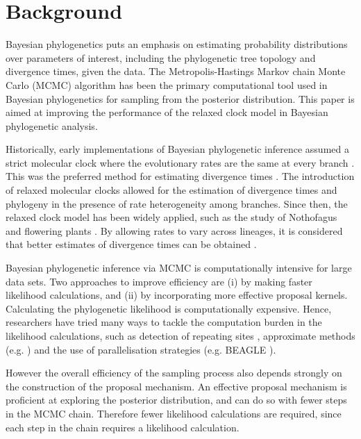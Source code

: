 \documentclass{bmcart}
\begin{document}

\section*{Background}
Bayesian phylogenetics puts an emphasis on estimating probability distributions over parameters of interest, including the phylogenetic tree topology and divergence times, given the data. The Metropolis-Hastings Markov chain Monte Carlo (MCMC) \cite{metropolis1953equation,hastings1970monte} algorithm has been the primary computational tool used in Bayesian phylogenetics for sampling from the posterior distribution. This paper is aimed at improving the performance of the relaxed clock model in Bayesian phylogenetic analysis.

Historically, early implementations of Bayesian phylogenetic inference \cite{yang1997bayesian} assumed a strict molecular clock where the evolutionary rates are the same at every branch \cite{zuckerkandl1965evolutionary}. This was the preferred method for estimating divergence times \cite{yang1997bayesian,rannala2003bayes}. The introduction of relaxed molecular clocks allowed for the estimation of divergence times \cite{thorne1998estimating} and phylogeny \cite{drummond2006relaxed} in the presence of rate heterogeneity among branches. Since then, the relaxed clock model has been widely applied, such as the study of Nothofagus \cite{knapp2005relaxed} and flowering plants \cite{smith2010uncorrelated}. By allowing rates to vary across lineages, it is considered that better estimates of divergence times can be obtained \cite{ho2005accuracy,renner2005relaxed,lepage2007general}.

Bayesian phylogenetic inference via MCMC is computationally intensive for large data sets.
Two approaches to improve efficiency are (i) by making faster likelihood calculations, and (ii) by incorporating more effective proposal kernels. Calculating the phylogenetic likelihood is computationally expensive.
Hence, researchers have tried many ways to tackle the computation burden in the likelihood calculations, such as detection of repeating sites \cite{kobert2017efficient},  approximate methods (e.g. \cite{reis2011approximate}) and the use of parallelisation strategies (e.g. BEAGLE \cite{ayres2011beagle}).

However the overall efficiency of the sampling process also depends strongly on the construction of the proposal mechanism. An effective proposal mechanism is proficient at exploring the posterior distribution, and can do so with fewer steps in the MCMC chain. Therefore fewer likelihood calculations are required, since each step in the chain requires a likelihood calculation.
\end{document}
